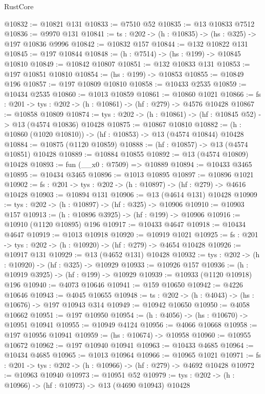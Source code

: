 \begin{lexlean}{RustCore}
\begin{coremodule}
@10832 := @10821 @131
@10833 := @7510 @52
@10835 := @13 @10833 @7512
@10836 := @9970 @131
@10841 := {ts : @202} -> (h : @10835) -> (hs : @325) -> @197 @10836 @9996
@10842 := @10832 @157
@10844 := @132 @10822 @131
@10845 := @197 @10844
@10848 := (h : @7514) -> (hs : @199) -> @10845 @10810
@10849 := @10842 @10807
@10851 := @132 @10833 @131
@10853 := @197 @10851 @10810
@10854 := (hs : @199) -> @10853
@10855 := @10849 @196
@10857 := @197 @10809 @10810
@10858 := @10433 @2535
@10859 := @10434 @2535
@10860 := @1013 @10859
@10861 := @10860 @1021
@10866 := {fs : @201} -> {tys : @202} -> (h : @10861) -> (hf : @279) -> @4576 @10428
@10867 := @10858 @10809
@10874 := {tys : @202} -> (h : @10861) -> (hf : @10845 @52) -> @13 (@4574 @10836) @10428
@10875 := @10867 @10810
@10882 := (h : @10860 (@1020 @10810)) -> (hf : @10853) -> @13 (@4574 @10844) @10428
@10884 := @10875 (@1120 @10859)
@10888 := (hf : @10857) -> @13 (@4574 @10851) @10428
@10889 := @10884 @10855
@10892 := @13 (@4574 @10809) @10428
@10893 := fun (__x0 : @7509) => @10889
@10894 := @10433 @3465
@10895 := @10434 @3465
@10896 := @1013 @10895
@10897 := @10896 @1021
@10902 := {fs : @201} -> {tys : @202} -> (h : @10897) -> (hf : @279) -> @4616 @10428
@10903 := @10894 @131
@10906 := @13 (@4614 @131) @10428
@10909 := {tys : @202} -> (h : @10897) -> (hf : @325) -> @10906
@10910 := @10903 @157
@10913 := (h : @10896 @3925) -> (hf : @199) -> @10906
@10916 := @10910 (@1120 @10895) @196
@10917 := @10433 @4647
@10918 := @10434 @4647
@10919 := @1013 @10918
@10920 := @10919 @1021
@10925 := {fs : @201} -> {tys : @202} -> (h : @10920) -> (hf : @279) -> @4654 @10428
@10926 := @10917 @131
@10929 := @13 (@4652 @131) @10428
@10932 := {tys : @202} -> (h : @10920) -> (hf : @325) -> @10929
@10933 := @10926 @157
@10936 := (h : @10919 @3925) -> (hf : @199) -> @10929
@10939 := @10933 (@1120 @10918) @196
@10940 := @4073 @10646
@10941 := @159 @10650
@10942 := @4226 @10646
@10943 := @4045 @10655
@10948 := {ts : @202} -> (h : @4043) -> (hs : @10676) -> @197 @10943 @314
@10949 := @10942 @10650
@10950 := @4058 @10662
@10951 := @197 @10950
@10954 := (h : @4056) -> (hs : @10670) -> @10951 @10941
@10955 := @10949 @4124
@10956 := @4066 @10668
@10958 := @197 @10956 @10941
@10959 := (hs : @10674) -> @10958
@10960 := @10955 @10672
@10962 := @197 @10940 @10941
@10963 := @10433 @4685
@10964 := @10434 @4685
@10965 := @1013 @10964
@10966 := @10965 @1021
@10971 := {fs : @201} -> {tys : @202} -> (h : @10966) -> (hf : @279) -> @4692 @10428
@10972 := @10963 @10940
@10973 := @10951 @52
@10979 := {tys : @202} -> (h : @10966) -> (hf : @10973) -> @13 (@4690 @10943) @10428

\end{coremodule}
\end{lexlean}

